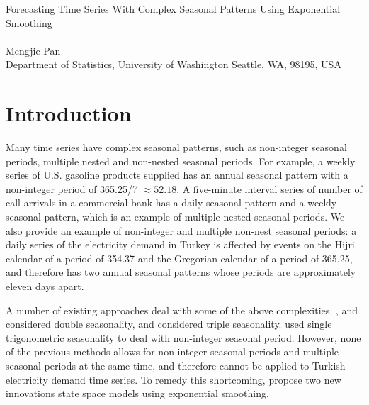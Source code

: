 \documentclass{uwstat572}
\begin{document}

\begin{center}
  {\LARGE Forecasting Time Series With Complex Seasonal Patterns Using Exponential Smoothing}\\\ \\
  {Mengjie Pan \\ 
    Department of Statistics, University of Washington Seattle, WA, 98195, USA
  }
\end{center}



\section{Introduction}

\hspace{4ex}Many time series have complex seasonal patterns, such as non-integer seasonal periods, multiple nested and non-nested seasonal periods. For example, a weekly series of U.S. gasoline products supplied has an annual seasonal pattern with a non-integer period of 365.25/7 $\approx 52.18$. A five-minute interval series of number of call arrivals in a commercial bank has a daily seasonal pattern and a weekly seasonal pattern, which is an example of multiple nested seasonal periods. We also provide an example of non-integer and multiple non-nest seasonal periods: a daily series of the electricity demand in Turkey is affected by events on the Hijri calendar of a period of 354.37 and the Gregorian calendar of a period of 365.25, and therefore has two annual seasonal patterns whose periods are approximately eleven days apart. 

A number of existing approaches deal with some of the above complexities. \citet{pedregal2006modulated}, \citet{harvey1993forecasting} and \citet{taylor2003short} considered double seasonality, and \citet{taylor2010triple} considered triple seasonality. \citet{harvey1997modeling} used single trigonometric seasonality to deal with non-integer seasonal period. However, none of the previous methods allows for non-integer seasonal periods and multiple seasonal periods at the same time, and therefore cannot be applied to Turkish electricity demand time series. To remedy this shortcoming, \citet{de2011forecasting} propose two new innovations state space models using exponential smoothing. 
\end{document}
